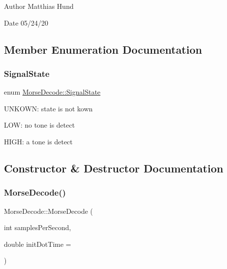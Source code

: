   

\begin{DoxyAuthor}{Author}
Matthias Hund 
\end{DoxyAuthor}
\begin{DoxyDate}{Date}
05/24/20 
\end{DoxyDate}


\subsection{Member Enumeration Documentation}
\mbox{\label{classMorseDecode_abe155104534fe272d25da5eb19b317bd}} 
\subsubsection{\texorpdfstring{Signal\+State}{SignalState}}
{\footnotesize\ttfamily enum \hyperlink{classMorseDecode_abe155104534fe272d25da5eb19b317bd}{Morse\+Decode\+::\+Signal\+State}\hspace{0.3cm}{\ttfamily [private]}}


\begin{DoxyItemize}
\item U\+N\+K\+O\+WN\+: state is not kown
\item L\+OW\+: no tone is detect
\item H\+I\+GH\+: a tone is detect 
\end{DoxyItemize}

\subsection{Constructor \& Destructor Documentation}
\mbox{\label{classMorseDecode_a00821fde89334d379f1922fb70ba943b}} 
\subsubsection{\texorpdfstring{Morse\+Decode()}{MorseDecode()}}
{\footnotesize\ttfamily Morse\+Decode\+::\+Morse\+Decode (\begin{DoxyParamCaption}\item[{int}]{samples\+Per\+Second,  }\item[{double}]{init\+Dot\+Time = {} }\end{DoxyParamCaption})}




